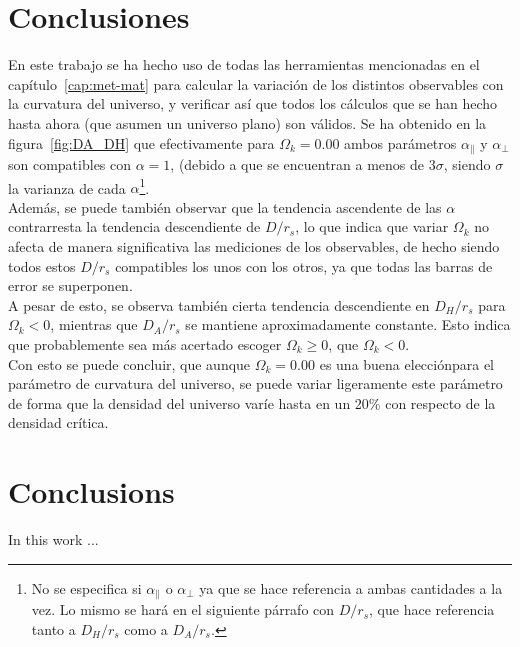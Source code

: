 \chapter*{Conclusiones}

En este trabajo se ha hecho uso de todas las herramientas mencionadas en el capítulo~\ref{cap:met-mat} para calcular la variación de los distintos observables con la curvatura del universo, y verificar así que todos los cálculos que se han hecho hasta ahora (que asumen un universo plano) son válidos. Se ha obtenido en la figura~\ref{fig:DA_DH} que efectivamente para $\Omega_k=0.00$ ambos parámetros  $\alpha_\parallel$ y $\alpha_\perp$ son compatibles con  $\alpha=1$, (debido a que se encuentran a menos de $3\sigma$, siendo $\sigma$ la varianza de cada $\alpha$\footnote{No se especifica si $\alpha_\parallel$ o $\alpha_\perp$ ya que se hace referencia a ambas cantidades a la vez. Lo mismo se hará en el siguiente párrafo con $D/r_s$, que hace referencia tanto a $D_H /r_s$ como a $D_A/r_s$.}.\\

Además, se puede también observar que la tendencia ascendente de las  $\alpha$ contrarresta la tendencia descendiente de $D /r_s$, lo que indica 	que variar $\Omega_k$ no afecta de manera significativa las mediciones de los observables, de hecho siendo todos estos $D /r_s$ compatibles los unos con los otros, ya que todas las barras de error se superponen.\\

A pesar de esto, se observa también cierta tendencia descendiente en $D_H /r_s$ para $\Omega_k<0$, mientras que $D_A / r_s$ se mantiene aproximadamente constante. Esto indica que probablemente sea más acertado escoger $\Omega_k \ge 0$, que $\Omega_k<0$. \\

Con esto se puede concluir, que aunque $\Omega_k=0.00$ es una buena elecciónpara el parámetro de curvatura del universo, se puede variar ligeramente este parámetro de forma que la densidad del universo varíe hasta en un 20\% con respecto de la densidad crítica.


\chapter*{Conclusions}

In this work ...
